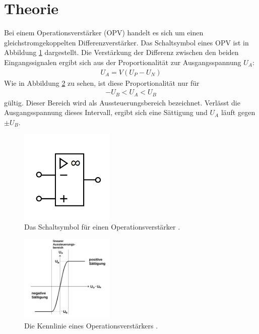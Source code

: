\section{Theorie}
\label{sec:Theorie}

    Bei einem Operationsverstärker (OPV) handelt es sich um einen gleichstromgekoppelten Differenzverstärker.
    Das Schaltsymbol eines OPV ist in Abbildung \ref{fig:opv} dargestellt.
    Die Verstärkung der Differenz zwischen den beiden Eingangssignalen ergibt sich aus der
    Proportionalität zur Ausgangsspannung $U_A$:
    \begin{align}
        U_A = V(U_P - U_N) 
    \end{align}
    Wie in Abbildung \ref{fig:aussteu} zu sehen, ist diese Proportionalität nur für
    \begin{align}
        -U_B < U_A < U_B
    \end{align}
    gültig. Dieser Bereich wird als Aussteuerungsbereich bezeichnet. Verlässt die Ausgangsspannung dieses Intervall, ergibt sich eine S\"attigung und
    $U_A$ l\"auft gegen $\pm U_B$.

    \begin{figure}
    \centering
    \includegraphics[width=0.4\textwidth]{Pics/schaltsymbol.png}
    \caption{Das Schaltsymbol für einen Operationsverstärker \cite{anleitungneu}.}
    \label{fig:opv}
    \end{figure}

    \begin{figure}
    \centering
    \includegraphics[width=0.4\textwidth]{Pics/aussteuerungsbereich.png}
    \caption{Die Kennlinie eines Operationsverstärkers \cite{anleitungalt}.}
    \label{fig:aussteu}
    \end{figure}

